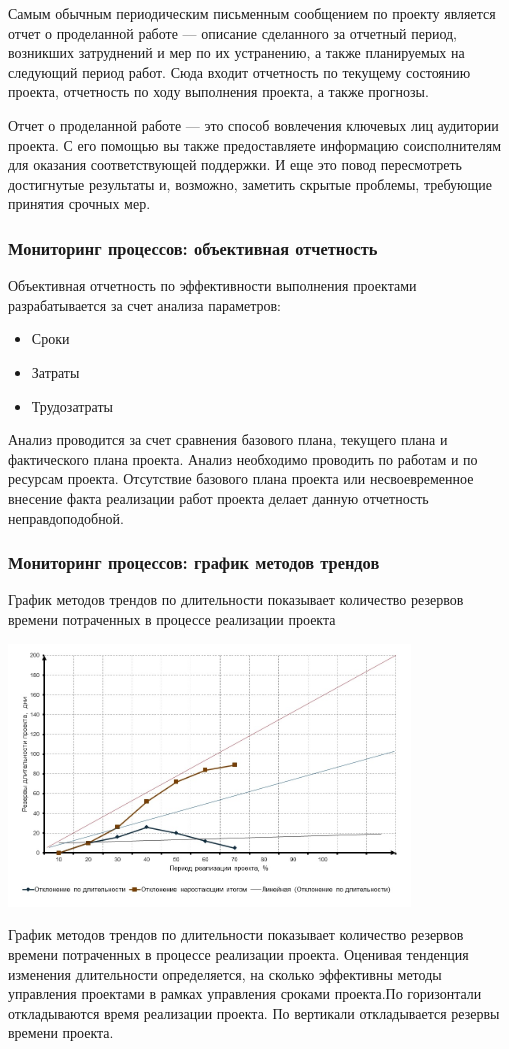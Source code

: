 \documentclass{../industrial-development}
\begin{document}
Самым обычным периодическим письменным сообщением по проекту является отчет о проделанной работе — описание сделанного за отчетный период, возникших затруднений и мер по их устранению, а также планируемых на следующий период работ. Сюда входит отчетность по текущему состоянию проекта, отчетность по ходу выполнения проекта, а также прогнозы.

Отчет о проделанной работе — это способ вовлечения ключевых лиц аудитории проекта. С его помощью вы также предоставляете информацию соисполнителям для оказания соответствующей поддержки. И еще это повод пересмотреть достигнутые результаты и, возможно, заметить скрытые проблемы, требующие принятия срочных мер.

\begin{frame} \frametitle{Мониторинг процессов: объективная отчетность}
	Объективная отчетность по эффективности выполнения проектами разрабатывается за счет анализа параметров:
	\begin{itemize}
		\item Сроки
		\item Затраты
		\item Трудозатраты
	\end{itemize}
\end{frame}
\lecturenotes

Анализ проводится за счет сравнения базового плана, текущего плана и фактического плана проекта. Анализ необходимо проводить по работам и по ресурсам проекта. Отсутствие базового плана проекта или несвоевременное внесение факта реализации работ проекта делает данную отчетность неправдоподобной. 

\begin{frame} \frametitle{Мониторинг процессов: график методов трендов}
	\begin{definition}
		\alert{График методов трендов} по длительности показывает количество резервов времени потраченных в процессе реализации проекта
	\end{definition}
	\centerline{\includegraphics[width=0.8\textwidth]{trend.jpg}}
\end{frame}
\lecturenotes

График методов трендов по длительности показывает количество резервов времени потраченных в процессе реализации проекта. Оценивая тенденция изменения длительности определяется, на сколько эффективны методы управления проектами в рамках управления сроками проекта.По горизонтали откладываются время реализации проекта. По вертикали откладывается резервы времени проекта.


    
\end{document}
